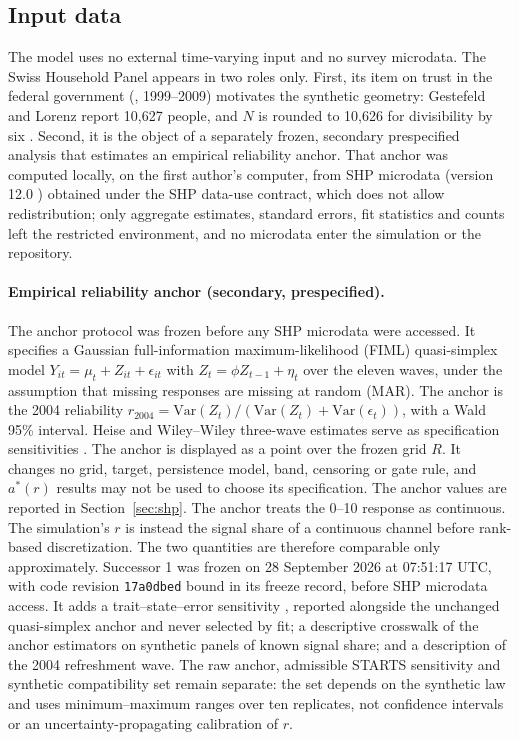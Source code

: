\subsection{Input data}

The model uses no external time-varying input and no survey microdata. The Swiss Household Panel appears in two roles only. First, its item on trust in the federal government (, 1999--2009) motivates the synthetic geometry: Gestefeld and Lorenz report 10,627 people, and $N$ is rounded to 10,626 for divisibility by six \cite{gestefeld2023}. Second, it is the object of a separately frozen, secondary prespecified analysis that estimates an empirical reliability anchor. That anchor was computed locally, on the first author's computer, from SHP microdata (version 12.0 \cite{shpgroup2026data}) obtained under the SHP data-use contract, which does not allow redistribution; only aggregate estimates, standard errors, fit statistics and counts left the restricted environment, and no microdata enter the simulation or the repository.

\paragraph{Empirical reliability anchor (secondary, prespecified).}
The anchor protocol was frozen before any SHP microdata were accessed. It specifies a Gaussian full-information maximum-likelihood (FIML) quasi-simplex model $Y_{it}=\mu_t+Z_{it}+\epsilon_{it}$ with $Z_t=\phi Z_{t-1}+\eta_t$ over the eleven waves, under the assumption that missing responses are missing at random (MAR). The anchor is the 2004 reliability $r_{2004}=\mathrm{Var}(Z_t)/(\mathrm{Var}(Z_t)+\mathrm{Var}(\epsilon_t))$, with a Wald 95\% interval. Heise and Wiley--Wiley three-wave estimates serve as specification sensitivities \cite{heise1969,wiley1970}. The anchor is displayed as a point over the frozen grid $R$. It changes no grid, target, persistence model, band, censoring or gate rule, and $a^*(r)$ results may not be used to choose its specification. The anchor values are reported in Section~\ref{sec:shp}. The anchor treats the 0--10 response as continuous. The simulation's $r$ is instead the signal share of a continuous channel before rank-based discretization. The two quantities are therefore comparable only approximately.
Successor 1 was frozen on 28 September 2026 at 07:51:17 UTC, with code revision \texttt{17a0dbed} bound in its freeze record, before SHP microdata access. %
It adds a trait--state--error sensitivity \cite{kenny1995tse}, reported alongside the unchanged quasi-simplex anchor and never selected by fit; a descriptive crosswalk of the anchor estimators on synthetic panels of known signal share; and a description of the 2004 refreshment wave. %
The raw anchor, admissible STARTS sensitivity and synthetic compatibility set remain separate: the set depends on the synthetic law and uses minimum--maximum ranges over ten replicates, not confidence intervals or an uncertainty-propagating calibration of $r$. %

